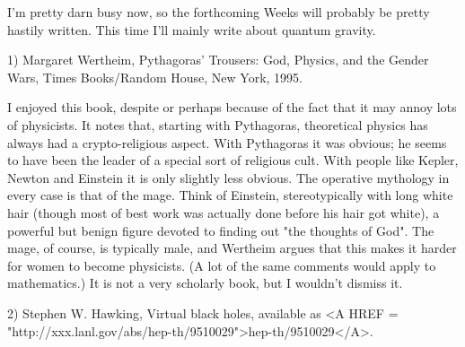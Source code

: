 

I'm pretty darn busy now, so the forthcoming Weeks will probably be
pretty hastily written.  This time I'll mainly write about quantum
gravity.  

1) Margaret Wertheim, Pythagoras' Trousers: God, Physics, and the Gender
Wars, Times Books/Random House, New York, 1995.

I enjoyed this book, despite or perhaps because of the fact that it may
annoy lots of physicists.  It notes that, starting with Pythagoras,
theoretical physics has always had a crypto-religious aspect.  With
Pythagoras it was obvious; he seems to have been the leader of a special
sort of religious cult.  With people like Kepler, Newton and Einstein it
is only slightly less obvious.  The operative mythology in every case is
that of the mage.  Think of Einstein, stereotypically with long white
hair (though most of best work was actually done before his hair got
white), a powerful but benign figure devoted to finding out "the
thoughts of God".  The mage, of course, is typically male, and Wertheim
argues that this makes it harder for women to become physicists.  (A lot
of the same comments would apply to mathematics.)  It is not a very
scholarly book, but I wouldn't dismiss it.

2) Stephen W. Hawking, Virtual black holes, available as
<A HREF = "http://xxx.lanl.gov/abs/hep-th/9510029">hep-th/9510029</A>.

